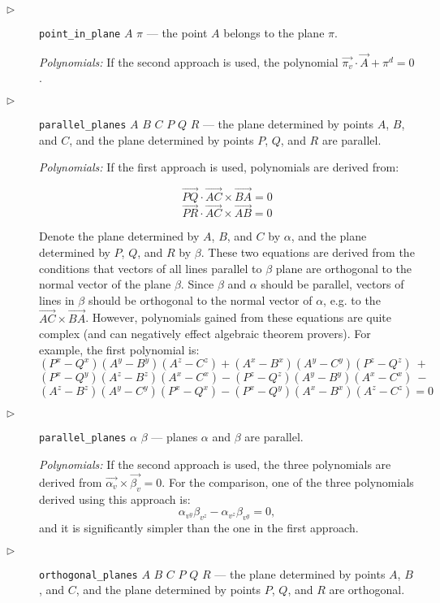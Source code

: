 \documentclass[final,1p,times,authoryear]{elsarticle}
\begin{document}
\begin{description}
\item[$\triangleright$] {\tt point\_in\_plane} $A$ $\pi$ --- the
  point $A$ belongs to the plane $\pi$.

  {\em Polynomials:} If the second approach is used, the polynomial
  $\overrightarrow{\pi_v} \cdot \overrightarrow{A} + \pi^{d} = 0$.

\item[$\triangleright$] {\tt parallel\_planes} $A$ $B$ $C$ $P$ $Q$ $R$
  --- the plane determined by points $A$, $B$, and $C$, and the plane
  determined by points $P$, $Q$, and $R$ are parallel.

{\em Polynomials:} If the first approach is used, polynomials are
derived from:

$$\overrightarrow{PQ}\cdot \overrightarrow{AC} \times \overrightarrow{BA} = 0$$
$$\overrightarrow{PR}\cdot \overrightarrow{AC} \times \overrightarrow{AB} = 0$$

Denote the plane determined by $A$, $B$, and $C$ by $\alpha$, and the
plane determined by $P$, $Q$, and $R$ by $\beta$. These two equations
are derived from the conditions that vectors of all lines parallel to
$\beta$ plane are orthogonal to the normal vector of the plane
$\beta$. Since $\beta$ and $\alpha$ should be parallel, vectors of
lines in $\beta$ should be orthogonal to the normal vector of
$\alpha$, e.g. to the
$\overrightarrow{AC} \times \overrightarrow{BA}$.  However,
polynomials gained from these equations are quite complex (and can
negatively effect algebraic theorem provers). For example, the first
polynomial is:
$$(P^x - Q^x)(A^y - B^y)(A^z - C^z) + (A^x - B^x)(A^y - C^y)(P^z - Q^z) \ +$$
$$(P^x - Q^y)(A^z - B^z)(A^x - C^x) - (P^z - Q^z)(A^y - B^y)(A^x - C^x) \ -$$
$$(A^z - B^z)(A^y - C^y)(P^x - Q^x) - (P^x - Q^y)(A^x - B^x)(A^z - C^z) = 0$$


\item[$\triangleright$] {\tt parallel\_planes} $\alpha$ $\beta$ ---
  planes $\alpha$ and $\beta$ are parallel.

{\em Polynomials:} 
If the second approach is used, the three polynomials are derived from
$\overrightarrow{\alpha_v} \times \overrightarrow{\beta_v} = 0.$ For
the comparison, one of the three polynomials derived using this
approach is:
$$\alpha_{v^y}\beta_{v^z} - \alpha_{v^z}\beta_{v^y} = 0,$$
and it is significantly simpler than the one in the first approach.

\item[$\triangleright$] {\tt orthogonal\_planes} $A$ $B$ $C$ $P$ $Q$ $R$
  --- the plane determined by points $A$, $B$, and $C$, and the plane
  determined by points $P$, $Q$, and $R$ are orthogonal.


\end{description}
\end{document}
